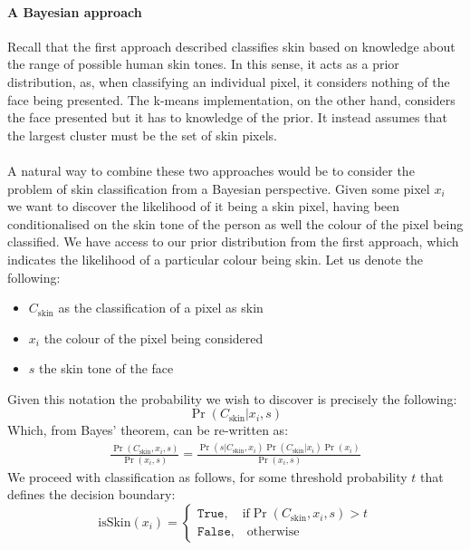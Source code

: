 \paragraph{A Bayesian approach}
Recall that the first approach described classifies skin based on knowledge about the range of possible human skin tones. 
In this sense, it acts as a prior distribution, as, when classifying an individual pixel, it considers nothing of the face being presented.
The k-means implementation, on the other hand, considers the face presented but it has to knowledge of the prior. It instead assumes that the largest cluster must be the set of skin pixels.
\\ \\ 
A natural way to combine these two approaches would be to consider the problem of skin classification from a Bayesian perspective. Given some pixel $x_i$ we want to discover the likelihood of it being a skin pixel, having been conditionalised on the skin tone of the person as well the colour of the pixel being classified. 
We have access to our prior distribution from the first approach, which indicates the likelihood of a particular colour being skin.
Let us denote the following: 
\begin{itemize}
   \item $C_{\mathrm{skin}}$ as the classification of a pixel as skin
   \item $x_i$ the colour of the pixel being considered
   \item $s$ the skin tone of the face
\end{itemize} 
Given this notation the probability we wish to discover is precisely the following:
\begin{equation*}
   \Pr(C_{\mathrm{skin}}| x_i, s) 
\end{equation*}
Which, from Bayes' theorem, can be re-written as: 
\begin{align*}
   \frac{\Pr(C_\mathrm{skin}, x_i, s)}{\Pr(x_i, s)} = \frac{\Pr(s|C_\mathrm{skin}, x_i)\Pr(C_\mathrm{skin}|x_i)\Pr(x_i)}{\Pr(x_i,s)}
\end{align*}
We proceed with classification as follows, for some threshold probability $t$ that defines the decision boundary: 
\begin{equation*}
    \text{isSkin}(x_i) = 
    \begin{cases}
        \texttt{True}, \quad \text{if} \Pr(C_\mathrm{skin}, x_i, s) > t \\
        \texttt{False}, \quad \text{otherwise}
    \end{cases}
\end{equation*}
